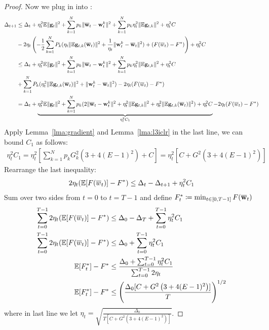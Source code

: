\begin{proof}
Now we plug in \eq{\ref{eq:a24}} into \eq{\ref{eq:main2}}:
\begin{align}
	\Delta_{t+1} & \leq \Delta_t + 
	\eta_{t}^{2} \mathbb{E}\| {\mathbf{g}}_{t} \|^{2} + \sum_{k=1}^N p_k \|\overline{{\mathbf{w}}}_t - {\mathbf{w}}_t^k\|^2 +  \sum_{k=1}^N p_k \eta_t^2 \|\mathbb{E} {\mathbf{g}}_{t,k}\|^2 + \eta_t^2 C \\
	 &- 2 \eta_t \left(-\frac{1}{2} \sum_{k=1}^{N} P_{k} (\eta_t \|\mathbb{E} {\mathbf{g}}_{t,k}(\overline{{\mathbf{w}}}_t) \|^2 + \frac{1}{\eta_t} \|{\mathbf{w}}_t^k - \overline{{\mathbf{w}}}_t\|^2) + (F(\overline{w}_t) - F^*) \right)  + \eta_t^2 C \\
	& \leq \Delta_t + 
	\eta_{t}^{2} \mathbb{E}\| {\mathbf{g}}_{t} \|^{2} + \sum_{k=1}^N p_k \|\overline{{\mathbf{w}}}_t - {\mathbf{w}}_t^k\|^2 +  \sum_{k=1}^N p_k \eta_t^2 \|\mathbb{E} {\mathbf{g}}_{t,k}\|^2  + \eta_t^2 C  \\
	& +\sum_{k=1}^{N} P_{k} (\eta_t^2 \|\mathbb{E} {\mathbf{g}}_{t,k}(\overline{{\mathbf{w}}}_t) \|^2 + \|{\mathbf{w}}_t^k - \overline{{\mathbf{w}}}_t\|^2) - 2\eta_t (F(\overline{w}_t) - F^*) \\
	& = \Delta_t + \underbrace{\eta_{t}^{2} \mathbb{E}\| {\mathbf{g}}_{t} \|^{2} +\sum_{k=1}^N p_k  ( 2\|\overline{{\mathbf{w}}}_t - {\mathbf{w}}_t^k\|^2  +  \eta_t^2 \|\mathbb{E} {\mathbf{g}}_{t,k}\|^2 + \eta_t^2 \|\mathbb{E} {\mathbf{g}}_{t,k}(\overline{{\mathbf{w}}}_t) \|^2 ) + \eta_t^2 C }_{\eta_t^2C_1}  - 2\eta_t (F(\overline{w}_t) - F^*) \label{eq:main3}
\end{align}
Apply Lemma~\ref{lma:gradient} and Lemma~\ref{lma:l3iclr} in the last line, we can bound $C_1$ as follows:
\begin{align}
\eta_t^2 C_1  = \eta_t^2 [\sum_{k=1}^N p_k G_k^2 \left(3 + 4(E-1)^2\right) + C]  = \eta_t^2 [C+ G^2 \left(3 + 4(E-1)^2\right)]
\end{align}
Rearrange the last inequality:
\begin{align}
	2\eta_t (\mathbb{E}[F(\overline{w}_t)] - F^*) \leq \Delta_t - \Delta_{t+1} + \eta_t^2 C_1 
\end{align}
Sum over two sides from $t=0$ to $t = T- 1$ and define $F^*_t \coloneqq \min_{t \in [0, T-1]} F(\overline{{\mathbf{w}}}_t)$
\begin{align}
	\sum_{t=0}^{T-1} 2\eta_t(\mathbb{E}[F(\overline{w}_t)] - F^*) & \leq \Delta_0 - \Delta_T + \sum_{t=0}^{T-1} \eta_t^2 C_1 \\
	\sum_{t=0}^{T-1} 2\eta_t(\mathbb{E}[F(\overline{w}_t)]- F^*) & \leq \Delta_0 + \sum_{t=0}^{T-1} \eta_t^2 C_1 \\
    \mathbb{E}[F^*_t] - F^* &\leq \frac{\Delta_0 + \sum_{t=0}^{T-1} \eta_t^2C_1 }{ \sum_{t=0}^{T-1}  2 \eta_t}\\
    \mathbb{E}[F^*_t] - F^* &\leq  \left(\frac{\Delta_0[C+ G^2 \left(3 + 4(E-1)^2\right)]}{T}\right)^{1/2}
\end{align}
where in last line we let $\eta_t  = \sqrt{ \frac{\Delta_0}{T[C+ G^2 \left(3 + 4(E-1)^2\right)]}}$.


\end{proof}
